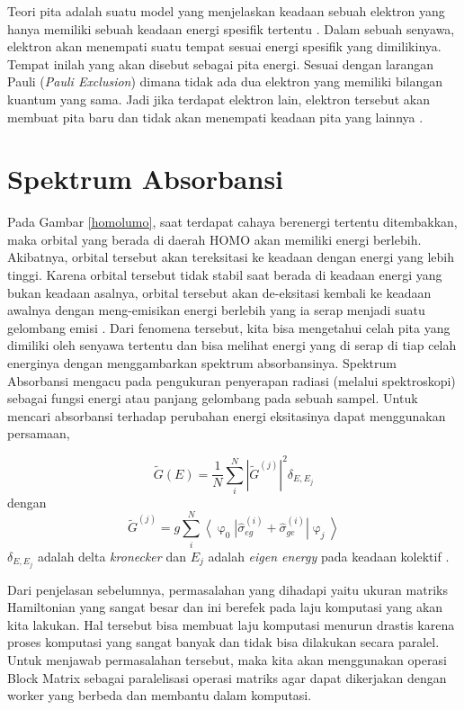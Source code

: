 \documentclass[12pt,a4paper]{report}
\newcommand{\bra}[1]{\ensuremath{\left\langle#1\right|}}
\newcommand{\ket}[1]{\ensuremath{\left|#1\right\rangle}}
\begin{document}
	Teori pita adalah suatu model yang menjelaskan keadaan sebuah elektron yang hanya memiliki sebuah keadaan energi spesifik tertentu \cite{Anil}. Dalam sebuah senyawa, elektron akan menempati suatu tempat sesuai energi spesifik yang dimilikinya. Tempat inilah yang akan disebut sebagai pita energi. Sesuai dengan larangan Pauli (\textit{Pauli Exclusion}) dimana tidak ada dua elektron yang memiliki bilangan kuantum yang sama. Jadi jika terdapat elektron lain, elektron tersebut akan membuat pita baru dan tidak akan menempati keadaan pita yang lainnya \cite{Faizi2021}.
	
	\section{Spektrum Absorbansi}
	
	Pada Gambar \ref{homolumo}, saat terdapat cahaya berenergi tertentu ditembakkan, maka orbital yang berada di daerah HOMO akan memiliki energi berlebih. Akibatnya, orbital tersebut akan tereksitasi ke keadaan dengan energi yang lebih tinggi. Karena orbital tersebut tidak stabil saat berada di keadaan energi yang bukan keadaan asalnya, orbital tersebut akan de-eksitasi kembali ke keadaan awalnya dengan meng-emisikan energi berlebih yang ia serap menjadi suatu gelombang emisi \cite{Bird2002}. Dari fenomena tersebut, kita bisa mengetahui celah pita yang dimiliki oleh senyawa tertentu dan bisa melihat energi yang di serap di tiap celah energinya dengan menggambarkan spektrum absorbansinya. Spektrum Absorbansi mengacu pada pengukuran penyerapan radiasi (melalui spektroskopi) sebagai fungsi energi atau panjang gelombang pada sebuah sampel. Untuk mencari absorbansi terhadap perubahan energi eksitasinya dapat menggunakan persamaan,
	
	\begin{equation}
	\label{absorbansi}
	\tilde{G}(E) = \frac{1}{N} \sum\limits_{i}^N |\tilde{G}^{(j)}|^{2}\delta_{E,E_{j}}
	\end{equation}
	dengan
	\begin{equation}
		\tilde{G}^{(j)} = g\sum\limits_{i}^N \bra{\upvarphi_0}\hat{\sigma}_{eg}^{(i)}+\hat{\sigma}_{ge}^{(i)}\ket{\upvarphi_j}
	\end{equation}
	$\delta_{E,E_{j}}$ adalah delta \textit{kronecker} dan $E_{j}$ adalah \textit{eigen energy} pada keadaan kolektif \cite{Abdussalam2017}. 
	
	Dari penjelasan sebelumnya, permasalahan yang dihadapi yaitu ukuran matriks Hamiltonian yang sangat besar dan ini berefek pada laju komputasi yang akan kita lakukan. Hal tersebut bisa membuat laju komputasi menurun drastis karena proses komputasi yang sangat banyak dan tidak bisa dilakukan secara paralel. Untuk menjawab permasalahan tersebut, maka kita akan menggunakan operasi Block Matrix sebagai paralelisasi operasi matriks agar dapat dikerjakan dengan worker yang berbeda dan membantu dalam komputasi.
	
\end{document}
